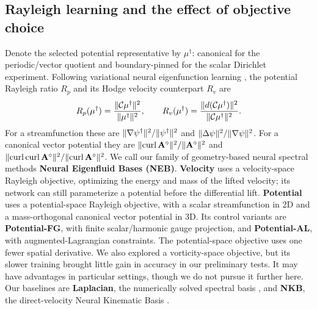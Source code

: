 \subsection{Rayleigh learning and the effect of objective choice}
Denote the selected potential representative by $\mu^\dagger$: canonical for the periodic/vector quotient and boundary-pinned for the scalar Dirichlet experiment. {Following variational neural eigenfunction learning \citep{e2018deep,pfau2019spectral,rowan2025rayleigh}, the potential Rayleigh ratio $R_p$ and its Hodge velocity counterpart $R_v$ are}
\begin{equation}
R_p(\mu^\dagger)=\frac{\lVert \mathcal C\mu^\dagger\rVert^2}{\lVert \mu^\dagger\rVert^2},
\qquad R_v(\mu^\dagger)=\frac{\lVert d(\mathcal C\mu^\dagger)\rVert^2}{\lVert \mathcal C\mu^\dagger\rVert^2}.
\label{eq:rayleigh}
\end{equation}
For a streamfunction these are $\lVert \nabla\psi^\dagger\rVert^2/\lVert \psi^\dagger\rVert^2$ and $\lVert \Delta\psi\rVert^2/\lVert \nabla\psi\rVert^2$. For a canonical vector potential they are $\lVert \operatorname{curl}\mathbf A^\circ\rVert^2/\lVert \mathbf A^\circ\rVert^2$ and $\lVert \operatorname{curl}\operatorname{curl}\mathbf A^\circ\rVert^2/\lVert \operatorname{curl}\mathbf A^\circ\rVert^2$. We call our family of geometry-based neural spectral methods \textbf{Neural Eigenfluid Bases (NEB)}. \textbf{Velocity} uses a velocity-space Rayleigh objective, optimizing the energy and mass of the lifted velocity; its network can still parameterize a potential before the differential lift. \textbf{Potential} uses a potential-space Rayleigh objective, with a scalar streamfunction in 2D and a mass-orthogonal canonical vector potential in 3D. Its control variants are \textbf{Potential-FG}, with finite scalar/harmonic gauge projection, and \textbf{Potential-AL}, with augmented-Lagrangian constraints. The potential-space objective uses one fewer spatial derivative. We also explored a vorticity-space objective, but its slower training brought little gain in accuracy in our preliminary tests. It may have advantages in particular settings, though we do not pursue it further here. Our baselines are \textbf{Laplacian}, the numerically solved spectral basis \citep{dewitt2012fluid}, and \textbf{NKB}, the direct-velocity Neural Kinematic Basis \citep{liu2025neural}.

